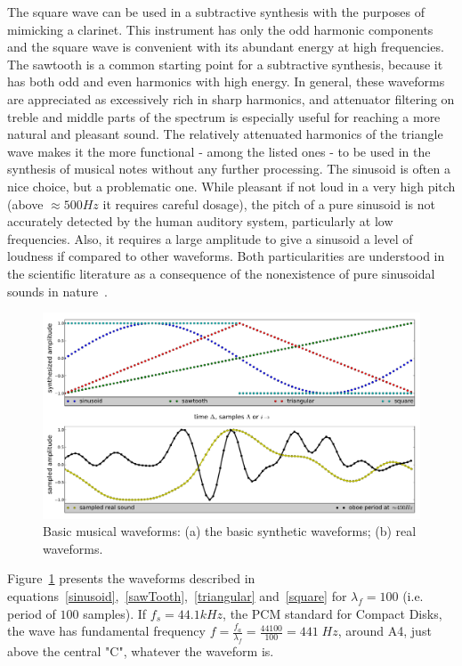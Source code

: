 The square wave can be used in a subtractive synthesis with the purposes of mimicking a clarinet. This instrument has only the odd harmonic components and the square wave is convenient with its abundant energy at high frequencies.
The sawtooth is a common starting point for a subtractive synthesis, because it has both odd and even harmonics with high energy. In general, these waveforms are appreciated as excessively rich in sharp harmonics, and attenuator filtering on treble and middle parts of the spectrum is especially useful for reaching a more natural and pleasant sound. 
The relatively attenuated harmonics of the triangle wave makes it the more functional - among the listed ones - to be used in the synthesis of musical notes without any further processing. The sinusoid is often a nice choice, but a problematic one. While pleasant if not loud in a very high pitch (above $\approx 500Hz$ it requires careful dosage), the pitch of a pure sinusoid is not accurately detected by the human auditory system, particularly at low frequencies. Also, it requires a large amplitude to give a sinusoid a level of loudness if compared to other waveforms. Both particularities are understood in the scientific literature as a consequence of the nonexistence of pure sinusoidal sounds in nature~\cite{Roederer}.

\begin{figure}
    \centering
        \includegraphics[width=.7\textwidth]{figures/waveForms_}
    \caption{Basic musical waveforms: (a) the basic synthetic  waveforms; (b) real waveforms.}
        \label{fig:formasDeOnda}
\end{figure}

Figure~\ref{fig:formasDeOnda} presents the waveforms described in equations~\ref{sinusoid},~\ref{sawTooth},~\ref{triangular} and~\ref{square} for $\lambda_f=100$ (i.e. period of $100$ samples). If $f_s=44.1kHz$, the PCM standard for Compact Disks, the wave has fundamental frequency $f=\frac{f_a}{\lambda_f}=\frac{44100}{100} = 441 \; Hz$, around A4, just above the central "C", whatever the waveform is.

